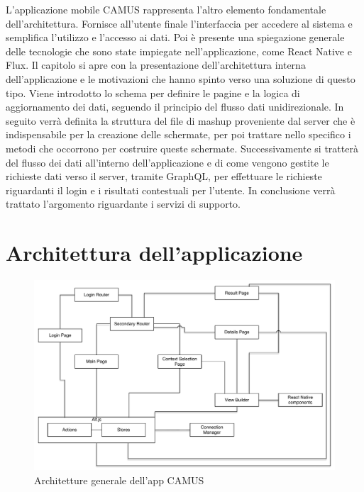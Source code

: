 L'applicazione mobile CAMUS rappresenta l'altro elemento fondamentale dell'ar\-chi\-tet\-tu\-ra. Fornisce all'utente finale l'interfaccia per accedere al sistema e semplifica l'utilizzo e l'accesso ai dati. Poi è presente una spiegazione generale delle tecnologie che sono state impiegate nell'applicazione, come React Native e Flux. Il capitolo si apre con la presentazione dell'architettura interna dell'applicazione e le motivazioni che hanno spinto verso una soluzione di questo tipo. Viene introdotto lo schema per definire le pagine e la logica di aggiornamento dei dati, seguendo il principio del flusso dati unidirezionale. In seguito verrà definita la struttura del file di mashup proveniente dal server che è indispensabile per la creazione delle schermate, per poi trattare nello specifico i metodi che occorrono per costruire queste schermate.
Successivamente si tratterà del flusso dei dati all'interno dell'applicazione e di come vengono gestite le richieste dati verso il server, tramite GraphQL, per effettuare le richieste riguardanti il login e i risultati contestuali per l'utente. In conclusione verrà trattato l'argomento riguardante i servizi di supporto.

\section {Architettura dell'applicazione}\label{sec:architettura-applicazione}

\begin{figure}[H]
	\centering
	\includegraphics[width=\textwidth]{6-implementazione-app/immagini/app_architecture.pdf}
	\caption{Architetture generale dell'app CAMUS}\label{fig:app-architecture}
\end{figure}

